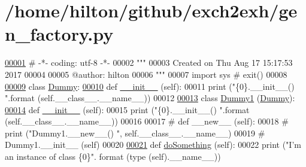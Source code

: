 \hypertarget{gen__factory_8py_source}{}\section{/home/hilton/github/exch2exh/gen\+\_\+factory.py}

\begin{DoxyCode}
\hyperlink{namespacegen__factory}{00001} \textcolor{comment}{# -*- coding: utf-8 -*-}
00002 \textcolor{stringliteral}{"""}
00003 \textcolor{stringliteral}{Created on Thu Aug 17 15:17:53 2017}
00004 \textcolor{stringliteral}{}
00005 \textcolor{stringliteral}{@author: hilton}
00006 \textcolor{stringliteral}{"""}
00007 \textcolor{keyword}{import} sys \textcolor{comment}{# exit()}
00008 
\hyperlink{classgen__factory_1_1_dummy}{00009} \textcolor{keyword}{class }\hyperlink{classgen__factory_1_1_dummy}{Dummy}: 
\hyperlink{classgen__factory_1_1_dummy_aed8c66d829aedd98a5b1bed80725ffab}{00010}     \textcolor{keyword}{def }\hyperlink{classgen__factory_1_1_dummy_aed8c66d829aedd98a5b1bed80725ffab}{\_\_init\_\_} (self):
00011         \textcolor{keywordflow}{print} (\textcolor{stringliteral}{"\{0\}.\_\_init\_\_() "}.format (self.\_\_class\_\_.\_\_name\_\_))
00012 
\hyperlink{classgen__factory_1_1_dummy1}{00013} \textcolor{keyword}{class }\hyperlink{classgen__factory_1_1_dummy1}{Dummy1} (\hyperlink{classgen__factory_1_1_dummy}{Dummy}):
\hyperlink{classgen__factory_1_1_dummy1_a9bb75256a466ee77a0ae2cafb339fe62}{00014}     \textcolor{keyword}{def }\hyperlink{classgen__factory_1_1_dummy1_a9bb75256a466ee77a0ae2cafb339fe62}{\_\_init\_\_} (self):
00015         \textcolor{keywordflow}{print} (\textcolor{stringliteral}{"\{0\}.\_\_init\_\_() "}.format (self.\_\_class\_\_.\_\_name\_\_))
00016         
00017 \textcolor{comment}{#    def \_\_new\_\_ (self):}
00018 \textcolor{comment}{#        print ("Dummy1.\_\_new\_\_() ", self.\_\_class\_\_.\_\_name\_\_)}
00019 \textcolor{comment}{#        Dummy1.\_\_init\_\_ (self)}
00020         
\hyperlink{classgen__factory_1_1_dummy1_af8a40601dbd998624323da24581dfa1c}{00021}     \textcolor{keyword}{def }\hyperlink{classgen__factory_1_1_dummy1_af8a40601dbd998624323da24581dfa1c}{doSomething} (self):
00022         \textcolor{keywordflow}{print} (\textcolor{stringliteral}{"I'm an instance of class \{0\}"}. format (type (self).\_\_name\_\_))

\end{DoxyCode}
